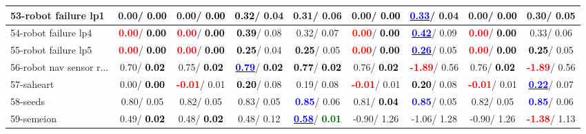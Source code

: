 \begin{table}[h]
\begin{center}
\begin{tabular}{lc|c|c|c|c|c|c|c}
53-robot failure lp1 &   0.00/\textcolor{black}{\textbf{  0.00}} &   0.00/\textcolor{black}{\textbf{  0.00}} & \textcolor{black}{\textbf{  0.32}}/  0.04 &   0.31/  0.06 &   0.00/\textcolor{black}{\textbf{  0.00}} & \underline{\textcolor{blue}{\textbf{  0.33}}}/  0.04 &   0.00/\textcolor{black}{\textbf{  0.00}} &   0.30/  0.05 \\ \hline
54-robot failure lp4 & \textcolor{red}{\textbf{  0.00}}/\textcolor{black}{\textbf{  0.00}} & \textcolor{red}{\textbf{  0.00}}/\textcolor{black}{\textbf{  0.00}} & \textcolor{black}{\textbf{  0.39}}/  0.08 &   0.32/  0.07 & \textcolor{red}{\textbf{  0.00}}/\textcolor{black}{\textbf{  0.00}} & \underline{\textcolor{blue}{\textbf{  0.42}}}/  0.09 & \textcolor{red}{\textbf{  0.00}}/\textcolor{black}{\textbf{  0.00}} &   0.33/  0.06 \\
55-robot failure lp5 & \textcolor{red}{\textbf{  0.00}}/\textcolor{black}{\textbf{  0.00}} & \textcolor{red}{\textbf{  0.00}}/\textcolor{black}{\textbf{  0.00}} & \textcolor{black}{\textbf{  0.25}}/  0.04 & \textcolor{black}{\textbf{  0.25}}/  0.05 & \textcolor{red}{\textbf{  0.00}}/\textcolor{black}{\textbf{  0.00}} & \underline{\textcolor{blue}{\textbf{  0.26}}}/  0.05 & \textcolor{red}{\textbf{  0.00}}/\textcolor{black}{\textbf{  0.00}} & \textcolor{black}{\textbf{  0.25}}/  0.05 \\
56-robot nav sensor r... &   0.70/\textcolor{black}{\textbf{  0.02}} &   0.75/\textcolor{black}{\textbf{  0.02}} & \underline{\textcolor{blue}{\textbf{  0.79}}}/\textcolor{black}{\textbf{  0.02}} & \textcolor{black}{\textbf{  0.77}}/\textcolor{black}{\textbf{  0.02}} &   0.76/\textcolor{black}{\textbf{  0.02}} & \textcolor{red}{\textbf{ -1.89}}/  0.56 &   0.76/\textcolor{black}{\textbf{  0.02}} & \textcolor{red}{\textbf{ -1.89}}/  0.56 \\
57-saheart &   0.00/\textcolor{black}{\textbf{  0.00}} & \textcolor{red}{\textbf{ -0.01}}/  0.01 & \textcolor{black}{\textbf{  0.20}}/  0.08 &   0.19/  0.08 & \textcolor{red}{\textbf{ -0.01}}/  0.01 & \textcolor{black}{\textbf{  0.20}}/  0.08 & \textcolor{red}{\textbf{ -0.01}}/  0.01 & \underline{\textcolor{blue}{\textbf{  0.22}}}/  0.07 \\
58-seeds &   0.80/  0.05 &   0.82/  0.05 &   0.83/  0.05 & \textcolor{blue}{\textbf{  0.85}}/  0.06 &   0.81/\textcolor{black}{\textbf{  0.04}} & \textcolor{blue}{\textbf{  0.85}}/  0.05 &   0.82/  0.05 & \textcolor{blue}{\textbf{  0.85}}/  0.06 \\
59-semeion &   0.49/\textcolor{black}{\textbf{  0.02}} &   0.48/\textcolor{black}{\textbf{  0.02}} &   0.48/  0.12 & \underline{\textcolor{blue}{\textbf{  0.58}}}/\textcolor{darkgreen}{\textbf{  0.01}} &  -0.90/  1.26 &  -1.06/  1.28 &  -0.90/  1.26 & \textcolor{red}{\textbf{ -1.38}}/  1.13 \\

\end{tabular}
\end{center}
\end{table}
